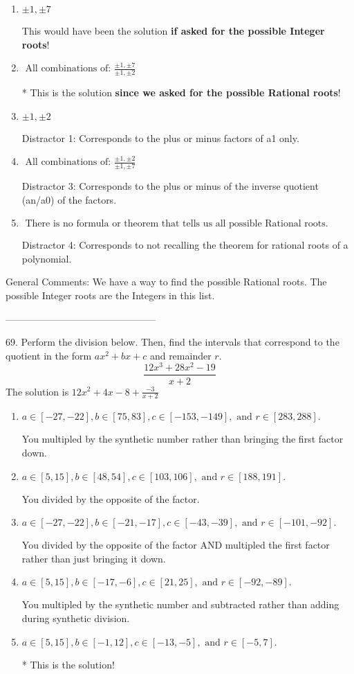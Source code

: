 \documentclass{extbook}[14pt]
\begin{document}
\begin{enumerate}[label=\Alph*.] 
\item $ \pm 1,\pm 7 $ 

 This would have been the solution \textbf{if asked for the possible Integer roots}! 
\item $ \text{ All combinations of: }\frac{\pm 1,\pm 7}{\pm 1,\pm 2} $ 

 * This is the solution \textbf{since we asked for the possible Rational roots}! 
\item $ \pm 1,\pm 2 $ 

  Distractor 1: Corresponds to the plus or minus factors of a1 only. 
\item $ \text{ All combinations of: }\frac{\pm 1,\pm 2}{\pm 1,\pm 7} $ 

  Distractor 3: Corresponds to the plus or minus of the inverse quotient (an/a0) of the factors.  
\item $ \text{ There is no formula or theorem that tells us all possible Rational roots.} $ 

  Distractor 4: Corresponds to not recalling the theorem for rational roots of a polynomial. 
\end{enumerate} 
 
General Comments: We have a way to find the possible Rational roots. The possible Integer roots are the Integers in this list.

-----------------------------------------------

69. Perform the division below. Then, find the intervals that correspond to the quotient in the form $ax^2+bx+c$ and remainder $r$.
\[ \frac{12x^{3} +28 x^{2} -19}{x + 2} \] 
The solution is $ 12x^{2} +4 x -8 + \frac{-3}{x + 2} $ 

\begin{enumerate}[label=\Alph*.] 
\item $ a \in [-27, -22], b \in [75, 83], c \in [-153, -149], \text{ and } r \in [283, 288]. $ 

  You multipled by the synthetic number rather than bringing the first factor down. 
\item $ a \in [5, 15], b \in [48, 54], c \in [103, 106], \text{ and } r \in [188, 191]. $ 

  You divided by the opposite of the factor. 
\item $ a \in [-27, -22], b \in [-21, -17], c \in [-43, -39], \text{ and } r \in [-101, -92]. $ 

  You divided by the opposite of the factor AND multipled the first factor rather than just bringing it down. 
\item $ a \in [5, 15], b \in [-17, -6], c \in [21, 25], \text{ and } r \in [-92, -89]. $ 

  You multipled by the synthetic number and subtracted rather than adding during synthetic division. 
\item $ a \in [5, 15], b \in [-1, 12], c \in [-13, -5], \text{ and } r \in [-5, 7]. $ 

 * This is the solution! 
\end{enumerate} 
 
\end{document}
